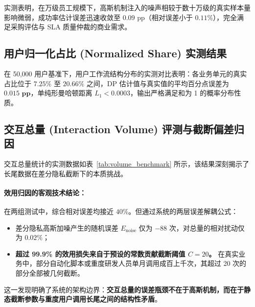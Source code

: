 实测表明，在万级员工规模下，高斯机制注入的噪声相较于数十万级的真实样本量影响微弱，成功率估计误差迅速收敛至 $0.09\text{ pp}$（相对误差小于 $0.11\%$），完全满足采购评估与 SLA 质量仲裁的商业需求。

\subsection{用户归一化占比 (Normalized Share) 实测结果}
在 50,000 用户基准下，用户工作流结构分布的实测对比表明：各业务单元的真实占比位于 $7.25\%$ 至 $20.66\%$ 之间，DP 估计值与真实值的平均百分点误差为 $\mathbf{0.015\text{ pp}}$，单纯形曼哈顿距离 $L_1 < 0.0003$，输出严格满足和为 1 的概率分布性质。

\subsection{交互总量 (Interaction Volume) 评测与截断偏差归因}
交互总量统计的实测数据如表~\ref{tab:volume_benchmark} 所示，该结果深刻揭示了长尾数据在差分隐私截断下的本质挑战。

\begin{table}[htbp]
\centering
\small
\caption{交互总量 (Interaction Volume) 两层误差解耦实测数据表 ($C=20, \varepsilon=1.0, \delta=10^{-6}$)}
\label{tab:volume_benchmark}
\end{table}

\paragraph{效用归因的客观技术结论：}
在两组测试中，综合相对误差均接近 $40\%$。但通过系统的两层误差解耦公式：
\begin{itemize}[leftmargin=2em]
  \item 差分隐私高斯加噪产生的随机误差 $E_{\text{noise}}$ 仅为 $-88$ 次，对总量的相对扰动仅为 $\mathbf{0.02\%}$；
  \item \textbf{超过 99.9\% 的效用损失来自于预设的常数贡献截断阈值 $C=20$。} 在真实业务中，部分自动化脚本或重度研发人员单月调用成百上千次，其超过 20 次的部分全部被几何截断。
\end{itemize}
这一发现明确了系统的架构边界：\textbf{交互总量的误差瓶颈不在于高斯机制，而在于静态截断参数与重度用户调用长尾之间的结构性矛盾}。

